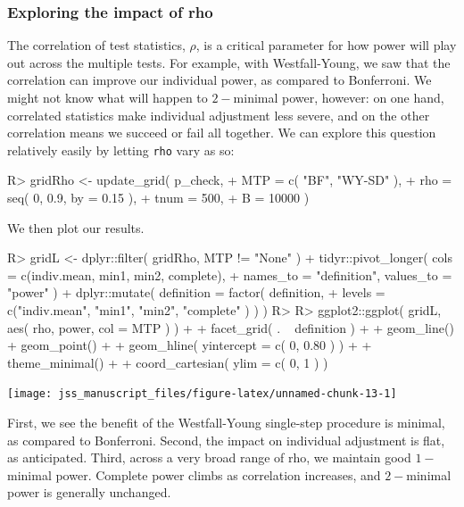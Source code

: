 \documentclass[
]{jss}
\begin{document}
\subsubsection{Exploring the impact of rho}

The correlation of test statistics, \(\rho\), is a critical parameter
for how power will play out across the multiple tests. For example, with
Westfall-Young, we saw that the correlation can improve our individual
power, as compared to Bonferroni. We might not know what will happen to
\(2-\)minimal power, however: on one hand, correlated statistics make
individual adjustment less severe, and on the other correlation means we
succeed or fail all together. We can explore this question relatively
easily by letting \texttt{rho} vary as so:

\begin{CodeChunk}
\begin{CodeInput}
R> gridRho <- update_grid( p_check,
+             MTP = c( "BF", "WY-SD" ),
+             rho = seq( 0, 0.9, by = 0.15 ),
+             tnum = 500,
+             B = 10000 )
\end{CodeInput}
\end{CodeChunk}

We then plot our results.

\begin{CodeChunk}
\begin{CodeInput}
R> gridL <- dplyr::filter( gridRho, MTP != "None" ) %
+   tidyr::pivot_longer( cols = c(indiv.mean, min1, min2, complete),
+                        names_to = "definition", values_to = "power" ) %
+   dplyr::mutate( definition = factor( definition,
+           levels = c("indiv.mean", "min1", "min2", "complete" ) ) )
R> 
R> ggplot2::ggplot( gridL, aes( rho, power, col = MTP ) ) +
+   facet_grid( . ~ definition ) +
+   geom_line() + geom_point() +
+   geom_hline( yintercept = c( 0, 0.80 ) ) + 
+   theme_minimal() +
+   coord_cartesian( ylim = c( 0, 1 ) )
\end{CodeInput}


\begin{center}\texttt{[image: jss\_manuscript\_files/figure-latex/unnamed-chunk-13-1]} \end{center}

\end{CodeChunk}

First, we see the benefit of the Westfall-Young single-step procedure is
minimal, as compared to Bonferroni. Second, the impact on individual
adjustment is flat, as anticipated. Third, across a very broad range of
rho, we maintain good \(1-\)minimal power. Complete power climbs as
correlation increases, and \(2-\)minimal power is generally unchanged.
\end{document}
